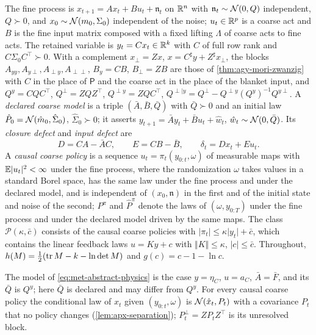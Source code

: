 \begin{definition}\label{def:apx-setting}
The fine process is $x_{t+1}=Ax_t+Bu_t+\mathfrak n_t$ on $\mathbb{R}^n$ with $\mathfrak n_t\sim\mathcal{N}(0,Q)$ independent, $Q\succ0$, and $x_0\sim\mathcal{N}(m_0,\Sigma_0)$ independent of the noise; $u_t\in\mathbb{R}^p$ is a coarse act and $B$ is the fine input matrix composed with a fixed lifting $\Lambda$ of coarse acts to fine acts. The retained variable is $y_t=Cx_t\in\mathbb{R}^k$ with $C$ of full row rank and $C\Sigma_0C^\top\succ0$. With a complement $x_\perp=Zx$, $x=C^\sharp y+Z^\sharp x_\perp$, the blocks $A_{yy},A_{y\perp},A_{\perp y},A_{\perp\perp}$, $B_y=CB$, $B_\perp=ZB$ are those of \cref{thm:agy-mori-zwanzig} with $C$ in the place of $\mathsf P$ and the coarse act in the place of the blanket input, and $Q^y=CQC^\top$, $Q^\perp=ZQZ^\top$, $Q^{\perp y}=ZQC^\top$, $Q^{\perp\mid y}=Q^\perp-Q^{\perp y}(Q^y)^{-1}Q^{y\perp}$. A \emph{declared coarse model} is a triple $(\bar A,\bar B,\bar Q)$ with $\bar Q\succ0$ and an initial law $\hat P_0=\mathcal{N}(\hat m_0,\hat\Sigma_0)$, $\hat\Sigma_0\succ0$; it asserts $y_{t+1}=\bar Ay_t+\bar Bu_t+\hat w_t$, $\hat w_t\sim\mathcal{N}(0,\bar Q)$. Its \emph{closure defect} and \emph{input defect} are
\begin{equation}\label{eq:apx-defects}
D=CA-\bar AC,\qquad E=CB-\bar B,\qquad \delta_t=Dx_t+Eu_t .
\end{equation}
A \emph{causal coarse policy} is a sequence $u_t=\pi_t(y_{0:t},\omega)$ of measurable maps with $\mathbb{E}\lvert u_t\rvert^2<\infty$ under the fine process, where the randomization $\omega$ takes values in a standard Borel space, has the same law under the fine process and under the declared model, and is independent of $(x_0,\mathfrak n)$ in the first and of the initial state and noise of the second; $P^\pi$ and $\hat P^\pi$ denote the laws of $(\omega,y_{0:T})$ under the fine process and under the declared model driven by the same maps. The class $\mathcal P(\kappa,\bar c)$ consists of the causal coarse policies with $\lvert\pi_t\rvert\le\kappa\lvert y_t\rvert+\bar c$, which contains the linear feedback laws $u=Ky+c$ with $\Vert K\Vert\le\kappa$, $\lvert c\rvert\le\bar c$. Throughout, $h(M)=\frac12(\operatorname{tr} M-k-\ln\det M)$ and $g(c)=c-1-\ln c$.
\end{definition}

The model of \cref{eq:met-abstract-physics} is the case $y=\eta_C$, $u=a_C$, $\bar A=\bar F$, and its $\bar Q$ is $Q^y$; here $\bar Q$ is declared and may differ from $Q^y$. For every causal coarse policy the conditional law of $x_t$ given $(y_{0:t},\omega)$ is $\mathcal{N}(\hat x_t,P_t)$ with a covariance $P_t$ that no policy changes (\cref{lem:apx-separation}); $P^\perp_t=ZP_tZ^\top$ is its unresolved block.

